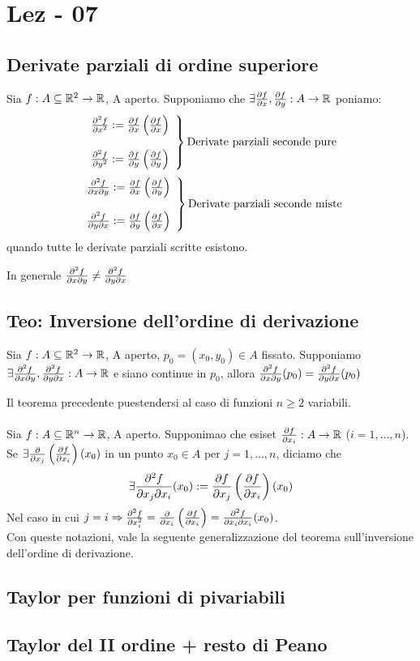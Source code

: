 \section{Lez - 07}
\subsection{Derivate parziali di ordine superiore}
Sia $f: A \subseteq \mathbb{R}^2 \to \mathbb{R}$, A aperto. Supponiamo che $\exists \frac{\partial f}{\partial x}, \frac{\partial f}{\partial y}: A \to \mathbb{R}$
poniamo:
$$\left.\begin{array}{l}
  \frac{\partial^2 f}{\partial x^2} := \frac{\partial f}{\partial x} \left(\frac{\partial f}{\partial x}\right) \\
  \\
  \frac{\partial^2 f}{\partial y^2} := \frac{\partial f}{\partial y} \left(\frac{\partial f}{\partial y}\right) \\
\end{array}\right\} \text{Derivate parziali seconde pure}$$
$$\left.\begin{array}{l}
  \frac{\partial^2 f}{\partial x \partial y} := \frac{\partial f}{\partial x} \left(\frac{\partial f}{\partial y}\right) \\
  \\
  \frac{\partial^2 f}{\partial y \partial x} := \frac{\partial f}{\partial y} \left(\frac{\partial f}{\partial x}\right) \\
\end{array}\right\} \text{Derivate parziali seconde miste}$$
quando tutte le derivate parziali scritte esistono.
\begin{osservazione}
  In generale $\frac{\partial^2 f}{\partial x \partial y} \neq \frac{\partial^2 f}{\partial y \partial x}$
\end{osservazione}
\subsection{Teo: Inversione dell'ordine di derivazione}
\begin{theorem}
  Sia $f: A \subseteq \mathbb{R}^2 \to \mathbb{R}$, A aperto, $p_0 = (x_0,y_0)\in A$ fissato. Supponiamo $\exists \frac{\partial^2 f}{\partial x \partial y}, \frac{\partial^2 f}{\partial y \partial x} 
  : A \to \mathbb{R}$ e siano continue in $p_0$, allora $\frac{\partial^2 f}{\partial x \partial y}(p_0) 
  = \frac{\partial^2 f}{\partial y \partial x} (p_0)$
\end{theorem}
Il teorema precedente pu\aco estendersi al caso di funzioni $n\geq 2$ variabili. \\\\
Sia $f: A \subseteq \mathbb{R}^n \to \mathbb{R}$, A aperto. Supponimao che esiset $\frac{\partial f}{\partial x_i} :A \to \mathbb{R}$ ($i = 1,\dots,n$). \\
Se $\exists \frac{\partial }{\partial x_j}\left(\frac{\partial f}{\partial x_i}\right)(x_0)$ in un punto $x_0 \in A$ per 
$j = 1,\dots,n$, diciamo che 
$$\exists \frac{\partial^2 f}{\partial x_j \partial x_i} (x_0) := \frac{\partial f}{\partial x_j}\left(\frac{\partial f}{\partial x_i}\right)(x_0)$$
Nel caso in cui $j=i \Rightarrow \frac{\partial^2 f}{\partial x_i^2} = \frac{\partial }{\partial x_i}\left(
\frac{\partial f}{\partial x_i}\right) = \frac{\partial^2 f}{\partial x_i \partial x_i}(x_0)$. \\
Con queste notazioni, vale la seguente generalizzazione del teorema sull'inversione dell'ordine di derivazione.
\begin{theorem}
  
\end{theorem}
\subsection{Taylor per funzioni di pi\acu variabili}
\subsection{Taylor del II ordine + resto di Peano}